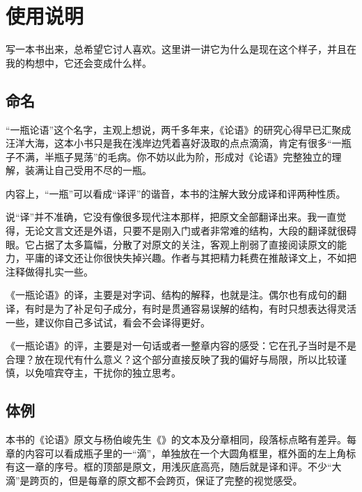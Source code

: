 \chapter*{使\quad 用\quad 说\quad 明}

写一本书出来，总希望它讨人喜欢。这里讲一讲它为什么是现在这个样子，并且在我的构想中，它还会变成什么样。


\lypdfbookmark\section*{命名}

“一瓶论语”这个名字，主观上想说，两千多年来，《论语》的研究心得早已汇聚成汪洋大海，这本小书只是我在浅岸边凭着喜好汲取的点点滴滴，肯定有很多“一瓶子不满，半瓶子晃荡”的毛病。你不妨以此为阶，形成对《论语》完整独立的理解，装满让自己受用不尽的一瓶。

内容上，“一瓶”可以看成“译评”的谐音，本书的注解大致分成译和评两种性质。

说“译”并不准确，它没有像很多现代注本那样，把原文全部翻译出来。我一直觉得，无论文言文还是外语，只要不是刚入门或者非常难的结构，大段的翻译就很碍眼。它占据了太多篇幅，分散了对原文的关注，客观上削弱了直接阅读原文的能力，平庸的译文还让你很快失掉兴趣。作者与其把精力耗费在推敲译文上，不如把注释做得扎实一些。

《一瓶论语》的译，主要是对字词、结构的解释，也就是注。偶尔也有成句的翻译，有时是为了补足句子成分，有时是贯通容易误解的结构，有时只想表达得灵活一些，建议你自己多试试，看会不会译得更好。

《一瓶论语》的评，主要是对一句话或者一整章内容的感受：它在孔子当时是不是合理？放在现代有什么意义？这个部分直接反映了我的偏好与局限，所以比较谨慎，以免喧宾夺主，干扰你的独立思考。


\lypdfbookmark\section*{体例}

本书的《论语》原文与杨伯峻先生《》的文本及分章相同，段落标点略有差异。每章的内容可以看成瓶子里的一“滴”，单独放在一个大圆角框里，框外面的左上角标有这一章的序号。框的顶部是原文，用\colorbox{lytextbackground}{浅灰底}高亮，随后就是译和评。不少“大滴”是跨页的，但是每章的原文都不会跨页，保证了完整的视觉感受。

